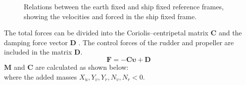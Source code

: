 \begin{figure}[h]
    \centering
    
    \caption{Relations between the earth fixed and ship fixed reference frames, showing the velocities and forced in the ship fixed frame.}
    \label{fig:reference_frames}
\end{figure}
The total forces can be divided into the Coriolis–centripetal matrix $\mathbf{C}$ and the damping force vector $\mathbf{D}$ \cite{fossenHandbookMarineCraft2011}. The control forces of the rudder and propeller are included in the matrix $\mathbf{D}$.
\begin{equation}
    \label{eq:upsilon1d}
\mathbf{F} = - \mathbf{C} \pmb{\upsilon} + \mathbf{D}
\end{equation}
$\mathbf{M}$ and $\mathbf{C}$ are calculated as shown below: 
\begin{equation}
    \label{eq:M_expanded}
    
\end{equation}
\begin{equation}
    \label{eq:C_expanded}
    
\end{equation}
where the added masses $X_{\dot{u}},Y_{\dot{v}},Y_{\dot{r}},N_{\dot{v}},N_{\dot{r}} < 0$. 

